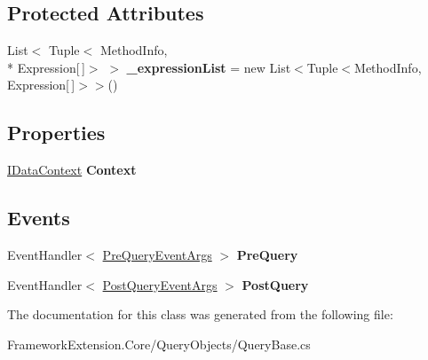 \subsection*{Protected Attributes}
\begin{DoxyCompactItemize}
\item 
\hypertarget{class_framework_extension_1_1_core_1_1_query_objects_1_1_query_base_afe3fbbf0f6c22ff295b19a2eef649809}{List$<$ Tuple$<$ Method\-Info, \\*
Expression\mbox{[}$\,$\mbox{]}$>$ $>$ {\bfseries \-\_\-expression\-List} = new List$<$Tuple$<$Method\-Info, Expression\mbox{[}$\,$\mbox{]}$>$$>$()}\label{class_framework_extension_1_1_core_1_1_query_objects_1_1_query_base_afe3fbbf0f6c22ff295b19a2eef649809}

\end{DoxyCompactItemize}
\subsection*{Properties}
\begin{DoxyCompactItemize}
\item 
\hypertarget{class_framework_extension_1_1_core_1_1_query_objects_1_1_query_base_af50eb6f52cf3f0474c58181ccafe040a}{\hyperlink{interface_framework_extension_1_1_core_1_1_interfaces_1_1_i_data_context}{I\-Data\-Context} {\bfseries Context}}\label{class_framework_extension_1_1_core_1_1_query_objects_1_1_query_base_af50eb6f52cf3f0474c58181ccafe040a}

\end{DoxyCompactItemize}
\subsection*{Events}
\begin{DoxyCompactItemize}
\item 
\hypertarget{class_framework_extension_1_1_core_1_1_query_objects_1_1_query_base_af88fe6bd4a96fd750d87b30c8a2a2b3a}{Event\-Handler$<$ \hyperlink{class_framework_extension_1_1_core_1_1_interceptors_1_1_events_1_1_pre_query_event_args}{Pre\-Query\-Event\-Args} $>$ {\bfseries Pre\-Query}}\label{class_framework_extension_1_1_core_1_1_query_objects_1_1_query_base_af88fe6bd4a96fd750d87b30c8a2a2b3a}

\item 
\hypertarget{class_framework_extension_1_1_core_1_1_query_objects_1_1_query_base_ad3ae4c0a5849c610d07492deb75097fd}{Event\-Handler$<$ \hyperlink{class_framework_extension_1_1_core_1_1_interceptors_1_1_events_1_1_post_query_event_args}{Post\-Query\-Event\-Args} $>$ {\bfseries Post\-Query}}\label{class_framework_extension_1_1_core_1_1_query_objects_1_1_query_base_ad3ae4c0a5849c610d07492deb75097fd}

\end{DoxyCompactItemize}


The documentation for this class was generated from the following file\-:\begin{DoxyCompactItemize}
\item 
Framework\-Extension.\-Core/\-Query\-Objects/Query\-Base.\-cs\end{DoxyCompactItemize}
